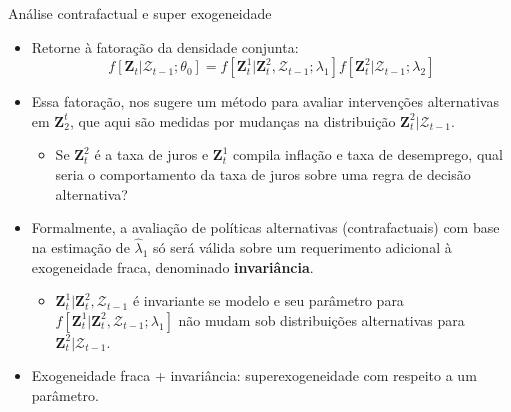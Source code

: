 \documentclass[11pt]{beamer}
\begin{document}
\begin{frame}{Análise contrafactual e super exogeneidade}
\begin{itemize}
	\item Retorne à fatoração da densidade conjunta:
	$$f[\boldsymbol{Z}_t|\mathcal{Z}_{t-1};\theta_0]  = f[\boldsymbol{Z}_t^1|\boldsymbol{Z}^2_t,\mathcal{Z}_{t-1};\lambda_1] f[\boldsymbol{Z}_t^2|\mathcal{Z}_{t-1};\lambda_2]$$
	\item Essa fatoração, nos sugere um método para avaliar intervenções alternativas em $\boldsymbol{Z}^t_2$, que aqui são medidas por mudanças na distribuição $\boldsymbol{Z}_t^2|\mathcal{Z}_{t-1}$.
	\begin{itemize}
		\item Se $\boldsymbol{Z}_t^2$ é a taxa de juros e $\boldsymbol{Z}_t^1$ compila inflação e taxa de desemprego, qual seria o comportamento da taxa de juros sobre uma regra de decisão alternativa?
	\end{itemize} 
	\item Formalmente, a avaliação de políticas alternativas (contrafactuais) com base na estimação de $\hat \lambda_1$ só será válida sobre um requerimento adicional à exogeneidade fraca, denominado \textbf{invariância}.
	\begin{itemize}
		\item $\boldsymbol{Z}_t^1|\boldsymbol{Z}^2_t,\mathcal{Z}_{t-1}$ é invariante se modelo e seu parâmetro para $f[\boldsymbol{Z}_t^1|\boldsymbol{Z}^2_t,\mathcal{Z}_{t-1};\lambda_1]$ não mudam sob distribuições alternativas para $\boldsymbol{Z}_t^2|\mathcal{Z}_{t-1}$.
	\end{itemize}
	\item Exogeneidade fraca + invariância: {\color{blue}superexogeneidade} com respeito a um parâmetro.
\end{itemize}
\end{frame}
\end{document}

